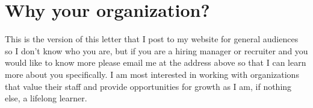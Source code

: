 \documentclass[11pt,a4paper,sans]{moderncv}        %
\begin{document}
\section{Why your organization?}

This is the version of this letter that I post to my website for general audiences so I don't know who you are, but if you are a hiring manager or recruiter and you would like to know more please email me at the address above so that I can learn more about you specifically.
I am most interested in working with organizations that value their staff and provide opportunities for growth as I am, if nothing else, a lifelong learner.



\makeletterclosing

\end{document}

